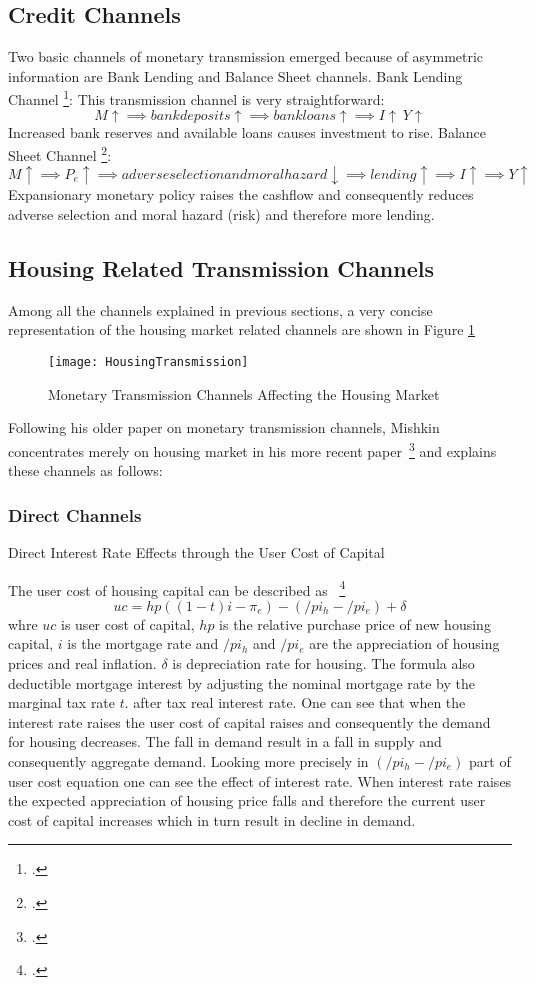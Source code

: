 \subsection{Credit Channels}
Two basic channels of monetary transmission emerged because of asymmetric information are Bank Lending and Balance Sheet channels. 
Bank Lending Channel \footcite[See.][]{Mishkin1996}:
This transmission channel is very straightforward:
 \[M \uparrow \implies bank deposits \uparrow \implies bank loans \uparrow \implies I \uparrow\ Y \uparrow\]
Increased bank reserves and available loans causes investment to rise.
Balance Sheet Channel \footcite[See.][]{Mishkin1996}:
 \[M \uparrow \implies P_e \uparrow \implies adverse selection and moral hazard \downarrow \implies lending \uparrow \implies I \uparrow \implies Y \uparrow\]
Expansionary monetary policy raises the cashflow and consequently reduces adverse selection and moral hazard (risk) and therefore more lending.

\subsection{Housing Related Transmission Channels}

Among all the channels explained in previous sections, a very concise representation of the housing market related channels are shown in Figure \ref{fig:HousingTransmission}
\begin{figure}[H]
\caption{Monetary Transmission Channels Affecting the Housing Market }\label{fig:HousingTransmission}
\texttt{[image: HousingTransmission]}
\\
\cite[Source: See][]{Wadud2009}
\end{figure}

Following his older paper on monetary transmission channels, Mishkin concentrates merely on housing market in his more recent paper~\footcite[See.][]{Mishkin1996} and explains these channels as follows:
\subsubsection{Direct Channels}
Direct Interest Rate Effects through the User Cost of Capital

The user cost of housing capital can be described as ~\footcite[See.][]{Mishkin2007}
 \[ uc = hp((1-t)i - \pi_e) - (/pi_h - /pi_e) + \delta \]
 whre $uc$ is user cost of capital, $hp$ is the relative purchase price of new housing capital, $i$ is the mortgage rate and $/pi_h$ and $/pi_e$ are the appreciation of housing prices and real inflation. $\delta$ is depreciation rate for housing. The formula also deductible mortgage interest by adjusting the nominal mortgage rate by the marginal tax rate $t$. after tax real interest rate. One can see that when the interest rate raises the user cost of capital raises  and consequently the demand for housing decreases. The fall in demand result in a fall in supply and consequently aggregate demand. Looking more precisely in $(/pi_h - /pi_e)$ part of user cost equation one can see the effect of interest rate. When interest rate raises the expected appreciation of housing price falls and therefore the current user cost of capital increases which in turn result in decline in demand. 

